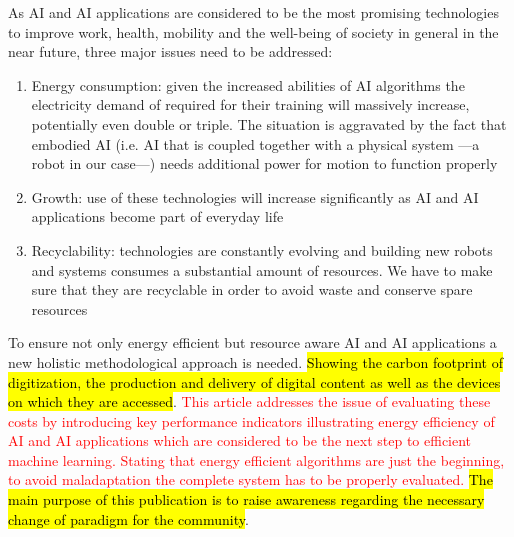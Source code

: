 As AI and AI applications are considered to be the most promising technologies to improve work, health, mobility and the well-being of society in general in the near future, three major issues need to be addressed:
\begin{enumerate}
	\item Energy consumption: given the increased abilities of AI algorithms the electricity demand of required for their training will massively increase, potentially even double or triple. The situation is aggravated by the fact that embodied AI (i.e. AI that is coupled together with a physical system ---a robot in our case---) needs additional power for motion to function properly
	\item Growth: use of these technologies will increase significantly as AI and AI applications become part of everyday life
	\item Recyclability: technologies are constantly evolving and building new robots and systems consumes a substantial amount of resources. We have to make sure that they are recyclable in order to avoid waste and conserve spare resources
\end{enumerate}
 
To ensure not only energy efficient but resource aware AI and AI applications a new holistic methodological approach is needed. \hl{Showing the carbon footprint of digitization, the production and delivery of digital content as well as the devices on which they are accessed}. \textcolor{red}{This article addresses the issue of evaluating these costs by introducing key performance indicators illustrating energy efficiency of AI and AI applications which are considered to be the next step to efficient machine learning. Stating that energy efficient algorithms are just the beginning, to avoid maladaptation the complete system has to be properly evaluated.}
\hl{The main purpose of this publication is to raise awareness regarding the necessary change of paradigm for the community}.